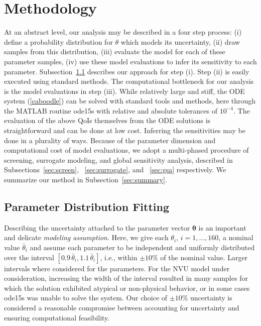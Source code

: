 \section{Methodology}\label{sec:meth}

At an abstract level, our analysis may be described in a four step process: (i) define a probability distribution for $\theta$ which models its uncertainty, (ii) draw samples from this distribution, (iii) evaluate the model for each of these parameter samples, (iv) use these model evaluations to infer its sensitivity to each parameter. Subsection~\ref{sec:param_dist_fit} describes our approach for step (i). Step (ii) is easily executed using standard methods. The computational bottleneck for our analysis is the model evaluations in step (iii). While relatively large and stiff, the ODE system (\ref{caboodle}) can be  solved with standard tools and methods, here through the MATLAB routine ode15s with relative and absolute tolerances of $10^{-4}$. The evaluation of the above QoIs themselves from the ODE solutions is straightforward and can be done at low cost. Inferring the sensitivities may be done in a plurality of ways. Because of the parameter dimension and computational cost of model evaluations, we adopt a multi-phased procedure of screening, surrogate modeling, and global sensitivity analysis, described in Subsections~\ref{sec:screen}, ~\ref{sec:surrogate}, and ~\ref{sec:gsa} respectively. We summarize our method in Subsection~\ref{sec:summary}.

\subsection{Parameter Distribution Fitting}
\label{sec:param_dist_fit}

Describing the uncertainty attached to the parameter vector $\boldsymbol{\theta}$ is an important and delicate {\sl modeling assumption}. Here, we give each $\theta_i$, $i=1,\dots, 160$, a nominal value $\bar \theta_i$ and assume each parameter to be independent and uniformly distributed over the interval $[0.9\, \bar\theta_i, 1.1 \,\bar\theta_i]$, i.e., within $\pm 10\%$ of the nominal value. Larger intervals where considered for the parameters. For the NVU model under consideration, increasing the width of the interval resulted in many samples for which the solution exhibited atypical or non-physical behavior, or in some cases ode15s was unable to solve the system. Our choice of $\pm 10\%$ uncertainty is considered a reasonable compromise between accounting for uncertainty and ensuring computational feasibility. 
	
